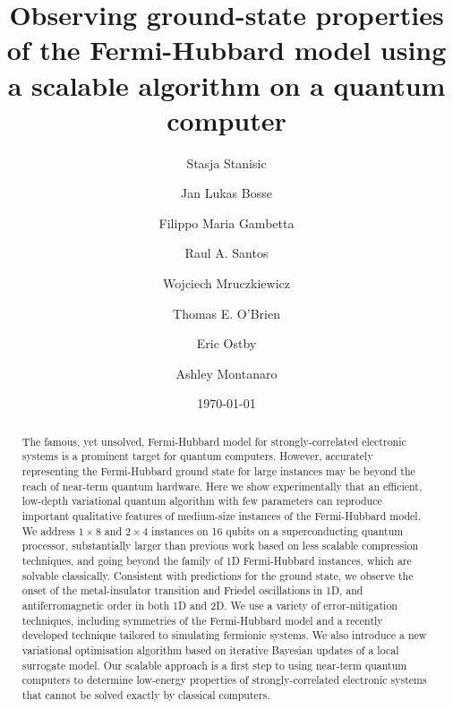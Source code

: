 \documentclass[aps,prb,twoside,superscriptaddress,longbibliography,nofootinbib,floatfix, notitlepage,twocolumn]{revtex4-1}
\begin{document}
\title{Observing ground-state properties of the Fermi-Hubbard model using a scalable algorithm on a quantum computer}
\date{\today}
\author{Stasja Stanisic}
\author{Jan Lukas Bosse}
\author{Filippo Maria Gambetta}
\author{Raul A. Santos}
\author{Wojciech Mruczkiewicz}
\author{Thomas E. O'Brien}
\author{Eric Ostby}
\author{Ashley Montanaro}

\begin{abstract}
The famous, yet unsolved, Fermi-Hubbard model for strongly-correlated electronic systems is a prominent target for quantum computers. However, accurately representing the Fermi-Hubbard ground state for large instances may be beyond the reach of near-term quantum hardware. Here we show experimentally that an efficient, low-depth variational quantum algorithm with few parameters can reproduce important qualitative features of medium-size instances of the Fermi-Hubbard model. We address $1\times 8$ and $2\times 4$ instances on 16 qubits on a superconducting quantum processor, substantially larger than previous work based on less scalable compression techniques, and going beyond the family of 1D Fermi-Hubbard instances, which are solvable classically. Consistent with predictions for the ground state, we observe the onset of the metal-insulator transition and Friedel oscillations in 1D, and antiferromagnetic order in both 1D and 2D. We use a variety of error-mitigation techniques, including symmetries of the Fermi-Hubbard model and a recently developed technique tailored to simulating fermionic systems. We also introduce a new variational optimisation algorithm based on iterative Bayesian updates of a local surrogate model. Our scalable approach is a first step to using near-term quantum computers to determine low-energy properties of strongly-correlated electronic systems that cannot be solved exactly by classical computers.
\end{abstract}

\maketitle

\setlength{\parskip}{3pt}
\end{document}
